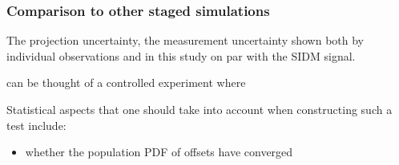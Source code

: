 \subsubsection{Comparison to other staged simulations}

The projection uncertainty, the measurement uncertainty shown both by
individual observations and in this study   
on par with the SIDM signal.

\cite{Kahlhoefer14}
\cite{Randall2008d} can be thought of a controlled experiment where 
\cite{Robertson2016}

% 
% 
% 
% 
% 



% 
% 
% 
% 
% 
% 
% 
% 
% 
% 
% 
% 
% 

 
% 
Statistical aspects that one should take into account when constructing such a
test include: 
\begin{itemize}
\item whether the population PDF of offsets have converged  
\end{itemize}
 
